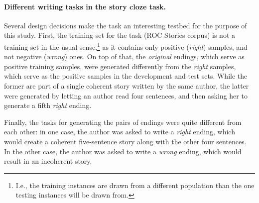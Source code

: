 \documentclass[11pt,a4paper]{article}
\newcommand{\resolved}[1]{}
\newcommand{\shortv}[1]{}
\newcommand{\roy}[1]{{\color{orange}\textsc{[#1 --rs]}}}
\newcommand{\yc}[1]{{\color{bblue}\{\textit{#1}\}$_{yc}$}}
\newcommand{\nascomment}[1]{{\color{blue}\textsc{[#1 --nas]}}}
\newcommand{\clinic}[1]{{\color{magenta}\textsc{[#1 --CLINIC]}}}
\renewcommand{\roy}[1]{{\color{orange}[#1 --rs]}}
\renewcommand{\roy}[1]{#1}
\renewcommand{\nascomment}[1]{}
\renewcommand{\yc}[1]{}
\begin{document}
\paragraph{Different writing tasks in the story cloze task.}
Several \shortv{key }design decisions make the task an interesting testbed for the purpose of this study.\resolved{\clinic{Which purpose?}}
First, the training set for the task (ROC Stories corpus) is not a
training set in the usual sense,\footnote{I.e., the training
  instances are drawn from a different population than the one
  testing instances will be drawn from.%
}  as it contains only positive ({\it right}) samples, and not negative ({\it wrong}) ones.\resolved{\yc{As far as I understand, this was intentional --- they didn't want
  people to pick up on random superfluous cues that can inevidently
  get into the data creation process, exactly the kind that our work
  picks up. Given that, stating this can be viewed as
  misunderstanding, I'm afraid.} \nascomment{We should maybe say that
  they did this intentionally and concede that our approach goes
  against the intentions of their task design.  But a task that
  insists that systems avoid using features that might encode one kind
of information (like style) is absurd.  Alternately, we could reframe
this not as ``things weren't controlled for'' but instead stick to the
facts here and just describe what they did without judgment.}}
On top of that, the {\it original} endings, which serve as positive training samples, were generated differently from the {\it right} samples, which serve as the positive samples in the development and test sets. 
While the former are part of a single coherent story written by the same author, the latter were generated by letting an author read four sentences, 
and then asking her to generate a fifth {\it right} ending. 

Finally,\shortv{ although the {\it right} and {\it wrong} sentences were generated by the same author,} 
the tasks for generating the pairs of endings were quite different from each other: in one case, the author was asked to write a {\it right} ending, which would create a coherent five-sentence story along with the other four sentences. In the other case, the author was asked to write a {\it wrong} ending, which would result in an incoherent \shortv{five-sentence }story. 
 \resolved{In this work, we show that these differences are significant and
impose different writing styles on authors. \nascomment{this bit feels
  a little heavy and reptititive.}}
\end{document}
